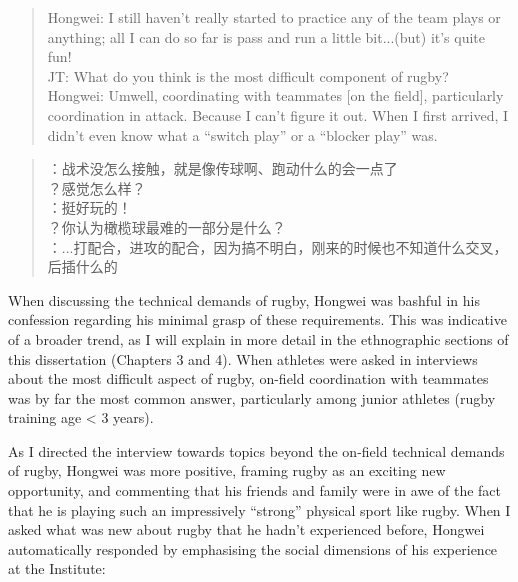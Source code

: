 \begin{quotation}
  Hongwei: I still haven’t really started to practice any of the team plays or anything; all I can do so far is pass and run a little bit...(but) it's quite fun! \\
  JT: What do you think is the most difficult component of rugby? \\
  Hongwei: Um\textellipsis well, coordinating with teammates [on the field], particularly coordination in attack.  Because I can't figure it out. When I first arrived, I didn’t even know what a ``switch play'' or a ``blocker play'' was.
\end{quotation}

\begin{CJK}{UTF8}{gbsn}
  \begin{quotation}
    ：战术没怎么接触，就是像传球啊、跑动什么的会一点了 \\
    ？感觉怎么样？\\
    ：挺好玩的！\\
    ？你认为橄榄球最难的一部分是什么？ \\
    ：...打配合，进攻的配合，因为搞不明白，刚来的时候也不知道什么交叉，后插什么的 \\
  \end{quotation}
\end{CJK}

When discussing the technical demands of rugby, Hongwei was bashful in his confession regarding his minimal grasp of these requirements. This was indicative of a broader trend, as I will explain in more detail in the ethnographic sections of this dissertation (Chapters 3 and 4). When athletes were asked in interviews about the most difficult aspect of rugby, on-field coordination with teammates was by far the most common answer, particularly among junior athletes (rugby training age < 3 years).

As I directed the interview towards topics beyond the on-field technical demands of rugby, Hongwei was more positive, framing rugby as an exciting new opportunity, and commenting that his friends and family were in awe of the fact that he is playing such an impressively ``strong'' physical sport like rugby. When I asked what was new about rugby that he hadn't experienced before, Hongwei automatically responded by emphasising the social dimensions of his experience at the Institute:

